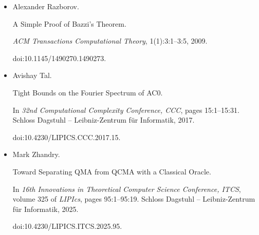 \documentclass[10pt,a4paper]{article}
\begin{document}
\begin{itemize}
In \emph{51st ACM Symposium on Theory of Computing, STOC}, pages
13–23. ACM, 2019.


doi:10.1145/3313276.3316315.





\item[] 
[21]

Alexander Razborov.


A Simple Proof of Bazzi’s Theorem.


\emph{ACM Transactions Computational Theory}, 1(1):3:1–3:5, 2009.


doi:10.1145/1490270.1490273.





\item[] 
[22]

Avishay Tal.


Tight Bounds on the Fourier Spectrum of AC0.


In \emph{32nd Computational Complexity Conference, CCC}, pages
15:1–15:31. Schloss Dagstuhl – Leibniz-Zentrum für Informatik, 2017.


doi:10.4230/LIPICS.CCC.2017.15.





\item[] 
[23]

Mark Zhandry.


Toward Separating QMA from QCMA with a Classical Oracle.


In \emph{16th Innovations in Theoretical Computer Science Conference,
ITCS}, volume 325 of \emph{LIPIcs}, pages 95:1–95:19. Schloss Dagstuhl –
Leibniz-Zentrum für Informatik, 2025.


doi:10.4230/LIPICS.ITCS.2025.95.





\end{itemize}
\end{document}
